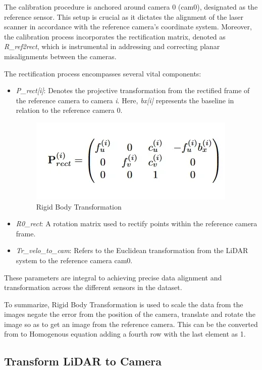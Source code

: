 \documentclass[letterpaper, 10 pt, conference]{ieeeconf}  %
\begin{document}
The calibration procedure is anchored around camera 0 (cam0), designated as the reference sensor. This setup is crucial as it dictates the alignment of the laser scanner in accordance with the reference camera's coordinate system. Moreover, the calibration process incorporates the rectification matrix, denoted as \textit{R\_ref2rect}, which is instrumental in addressing and correcting planar misalignments between the cameras.

The rectification process encompasses several vital components:
\begin{itemize}
  \item \textit{P\_rect[i]}: Denotes the projective transformation from the rectified frame of the reference camera to camera \textit{i}. Here, \textit{bx[i]} represents the baseline in relation to the reference camera 0.
\begin{figure}[htbp]
  \centering
  \includegraphics[width=\linewidth]{PiRect.png}
  \caption{Rigid Body Transformation}
  \label{Rigid Body Transformation}
\end{figure}
  \item \textit{R0\_rect}: A rotation matrix used to rectify points within the reference camera frame.
  \item \textit{Tr\_velo\_to\_cam}: Refers to the Euclidean transformation from the LiDAR system to the reference camera cam0.
\end{itemize}
These parameters are integral to achieving precise data alignment and transformation across the different sensors in the dataset.

To summarize, Rigid Body Transformation is used to scale the data from the images negate the error from the position of the camera, translate and rotate the image so as to get an image from the reference camera. This can be the converted from to Homogenous equation adding a fourth row with the last element as 1.


\subsection{Transform LiDAR to Camera}
\end{document}
